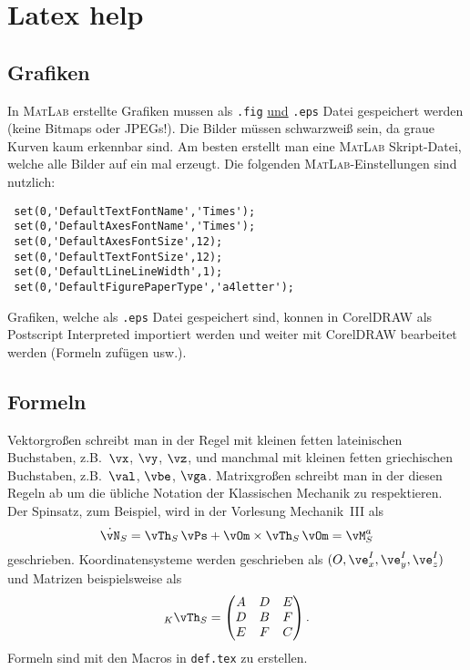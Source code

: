 \chapter{Latex help}\label{KapitelBericht}

\section{Grafiken}
In \textsc{MatLab} erstellte Grafiken mussen als \verb".fig" \underline{und} \verb".eps" Datei gespeichert werden
(keine Bitmaps oder JPEGs!). Die Bilder müssen schwarzwei{\ss} sein, da graue Kurven kaum erkennbar sind. Am besten
erstellt man eine \textsc{MatLab} Skript-Datei, welche alle Bilder auf ein mal erzeugt. Die folgenden
\textsc{MatLab}-Einstellungen sind nutzlich:
\begin{verbatim}
 set(0,'DefaultTextFontName','Times');
 set(0,'DefaultAxesFontName','Times');
 set(0,'DefaultAxesFontSize',12);
 set(0,'DefaultTextFontSize',12);
 set(0,'DefaultLineLineWidth',1);
 set(0,'DefaultFigurePaperType','a4letter');
\end{verbatim}
Grafiken, welche als \verb".eps" Datei gespeichert sind, konnen in CorelDRAW als Postscript Interpreted importiert
werden und weiter mit CorelDRAW bearbeitet werden (Formeln zufügen usw.).



\section{Formeln}
Vektorgro{\ss}en schreibt man in der Regel mit kleinen fetten lateinischen Buchstaben, z.B.\ $\vx$, $\vy$, $\vz$, und
manchmal mit kleinen fetten griechischen Buchstaben, z.B.\ $\val$, $\vbe$, $\vga$. Matrixgro{\ss}en schreibt man in der
diesen Regeln ab um die übliche Notation der Klassischen Mechanik zu respektieren. Der Spinsatz, zum Beispiel, wird in
der Vorlesung Mechanik~III als
\begin{equation}\label{spinsatz}
 \dot{\vN}_S = \vTh_S\,\vPs + \vOm\times\vTh_S\,\vOm =
 \vM_S^a
\end{equation}
geschrieben. Koordinatensysteme werden geschrieben als $(O, \ve_x^I, \ve_y^I, \ve_z^I)$ und Matrizen beispielsweise als
\begin{equation}
 _K\vTh_S = \begin{pmatrix}
              A & D & E\\
              D & B & F\\
              E & F & C
            \end{pmatrix}.
\end{equation}
Formeln sind mit den Macros in \verb"def.tex" zu erstellen.